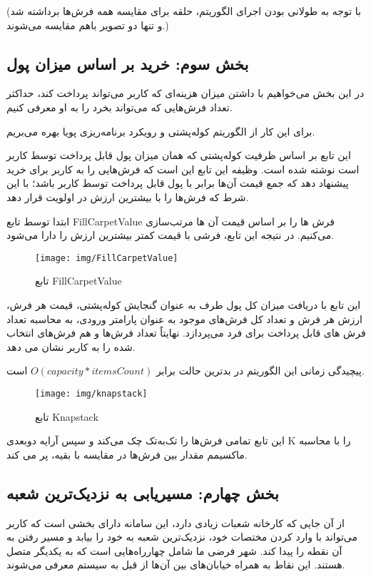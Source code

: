 \documentclass[12pt]{article}
\begin{document}
	(با توجه به طولانی بودن اجرای الگوریتم، حلقه برای مقایسه همه فرش‌ها برداشته شد و تنها دو تصویر باهم مقایسه می‌شوند.)

	\newpage
	\subsection{بخش سوم: خرید بر اساس میزان پول}
	در این بخش می‌خواهیم با داشتن میزان هزینه‌ای که کاربر می‌تواند پرداخت کند، حداکثر تعداد فرش‌هایی که می‌تواند بخرد را به او معرفی کنیم.

	برای این کار از الگوریتم کوله‌پشتی و رویکرد برنامه‌ریزی پویا بهره می‌بریم.

	این تابع بر اساس ظرفیت کوله‌پشتی که همان میزان پول قابل پرداخت توسط کاربر است نوشته شده است. وظیفه این تابع این است که فرش‌هایی را به کاربر برای خرید پیشنهاد دهد که جمع قیمت آن‌ها برابر با پول قابل پرداخت توسط کاربر باشد؛ با این شرط که فرش‌ها را با بیشترین ارزش در اولویت قرار دهد.

	ابتدا توسط تابع
	FillCarpetValue
	فرش ها را بر اساس قیمت آن ها مرتب‌سازی می‌کنیم. در نتیجه این تابع، فرشی با قیمت کمتر بیشترین ارزش را دارا می‌شود.
	\begin{figure}[H]
		\centering
		\texttt{[image: img/FillCarpetValue]}
		\caption{تابع FillCarpetValue}
		\label{fig:fillcarpetvalue}
	\end{figure}
	این تابع با دریافت میزان کل پول طرف به عنوان گنجایش کوله‌پشتی، قیمت هر فرش، ارزش هر فرش و تعداد کل فرش‌های موجود به عنوان پارامتر ورودی، به محاسبه تعداد فرش های قابل پرداخت برای فرد می‌پردازد. نهایتاً تعداد فرش‌ها و هم فرش‌های انتخاب شده را به کاربر نشان می دهد.

پیچیدگی زمانی این الگوریتم در بدترین حالت برابر
 	$O(capacity*itemsCount)$
 است.
	\begin{figure}[H]
		\centering
		\texttt{[image: img/knapstack]}
		\caption{تابع Knapstack}
		\label{fig:knapstack}
	\end{figure}

	این تابع تمامی فرش‌ها را تک‌به‌تک چک می‌کند و سپس آرایه دوبعدی K را با محاسبه 	ماکسیمم مقدار بین فرش‌ها در مقایسه با بقیه، پر می کند.

	\newpage
	\subsection{بخش چهارم: مسیریابی به نزدیک‌ترین شعبه}
	از آن جایی که کارخانه شعبات زیادی دارد، این سامانه دارای بخشی است که کاربر می‌تواند با وارد کردن مختصات خود، نزدیک‌ترین شعبه به خود را بیابد و مسیر رفتن به آن نقطه را پیدا کند. شهر فرضی ما شامل چهارراه‌هایی است که به یکدیگر متصل هستند. این نقاط به همراه خیابان‌های بین آن‌ها از قبل به سیستم معرفی می‌شوند.
\end{document}
